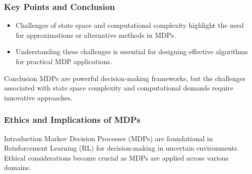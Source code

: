 \documentclass{beamer}
\begin{document}
\begin{frame}[fragile]
    \frametitle{Key Points and Conclusion}
    \begin{itemize}
        \item Challenges of state space and computational complexity highlight the need for approximations or alternative methods in MDPs.
        \item Understanding these challenges is essential for designing effective algorithms for practical MDP applications.
    \end{itemize}
    \begin{block}{Conclusion}
        MDPs are powerful decision-making frameworks, but the challenges associated with state space complexity and computational demands require innovative approaches.
    \end{block}
\end{frame}

\begin{frame}[fragile]
    \frametitle{Ethics and Implications of MDPs}
    \begin{block}{Introduction}
        Markov Decision Processes (MDPs) are foundational in Reinforcement Learning (RL) for decision-making in uncertain environments. Ethical considerations become crucial as MDPs are applied across various domains.
    \end{block}
\end{frame}
\end{document}
